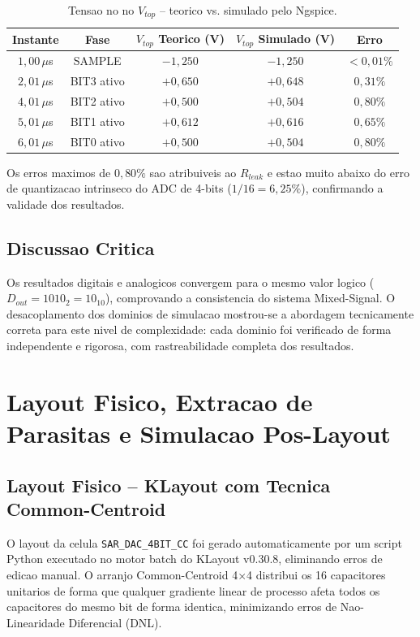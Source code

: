 \documentclass[12pt, a4paper]{article}
\begin{document}
\begin{table}[h!]
\centering
\caption{Tensao no no $V_{top}$ -- teorico vs. simulado pelo Ngspice.}
\label{tab:sim_spice}
\begin{tabular}{ccccc}
\toprule
\textbf{Instante} & \textbf{Fase} & $V_{top}$ Teorico (V) & $V_{top}$ Simulado (V) & \textbf{Erro} \\
\midrule
$1{,}00\,\mu$s & SAMPLE  & $-1{,}250$ & $-1{,}250$ & $<0{,}01\%$ \\
$2{,}01\,\mu$s & BIT3 ativo & $+0{,}650$ & $+0{,}648$ & $0{,}31\%$ \\
$4{,}01\,\mu$s & BIT2 ativo & $+0{,}500$ & $+0{,}504$ & $0{,}80\%$ \\
$5{,}01\,\mu$s & BIT1 ativo & $+0{,}612$ & $+0{,}616$ & $0{,}65\%$ \\
$6{,}01\,\mu$s & BIT0 ativo & $+0{,}500$ & $+0{,}504$ & $0{,}80\%$ \\
\bottomrule
\end{tabular}
\end{table}

Os erros maximos de $0{,}80\%$ sao atribuiveis ao $R_{leak}$ e estao muito abaixo do
erro de quantizacao intrinseco do ADC de 4-bits ($1/16 = 6{,}25\%$), confirmando a
validade dos resultados.

\subsection{Discussao Critica}

Os resultados digitais e analogicos convergem para o mesmo valor logico
($D_{out} = 1010_2 = 10_{10}$), comprovando a consistencia do sistema Mixed-Signal.
O desacoplamento dos dominios de simulacao mostrou-se a abordagem tecnicamente correta
para este nivel de complexidade: cada dominio foi verificado de forma independente e rigorosa,
com rastreabilidade completa dos resultados.

\section{Layout Fisico, Extracao de Parasitas e Simulacao Pos-Layout}

\subsection{Layout Fisico -- KLayout com Tecnica Common-Centroid}

O layout da celula \texttt{SAR\_DAC\_4BIT\_CC} foi gerado automaticamente por um script Python
executado no motor batch do KLayout v0.30.8, eliminando erros de edicao manual.
O arranjo Common-Centroid 4$\times$4 distribui os 16 capacitores unitarios de forma que
qualquer gradiente linear de processo afeta todos os capacitores do mesmo bit de forma identica,
minimizando erros de Nao-Linearidade Diferencial (DNL).
\end{document}
